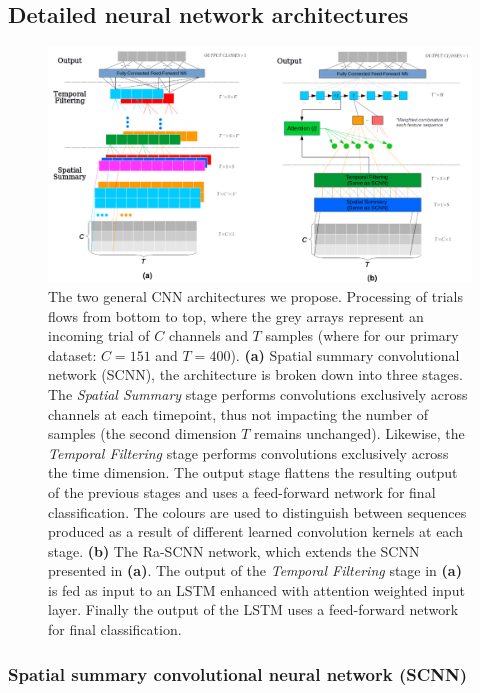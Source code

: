 \documentclass[fleqn,10pt]{wlscirep}
\begin{document}
\subsection*{Detailed neural network architectures}

\begin{figure}[t]
  \centering\includegraphics[width=\linewidth]{architectures.png}
  \caption{The two general CNN architectures we propose. Processing of trials flows from bottom to top, where the grey arrays represent an incoming trial of $C$ channels and $T$ samples (where for our primary dataset: $C=151$ and $T=400$). \textbf{(a)} Spatial summary convolutional network (SCNN), the architecture is broken down into three stages. The {\em Spatial Summary} stage performs convolutions exclusively across channels at each timepoint, thus not impacting the number of samples (the second dimension $T$ remains unchanged). Likewise, the {\em Temporal Filtering} stage performs convolutions exclusively across the time dimension. The output stage flattens the resulting output of the previous stages and uses a feed-forward network for final classification. The colours are used to distinguish between sequences produced as a result of different learned convolution kernels at each stage. \textbf{(b)} The Ra-SCNN network, which extends the SCNN presented in \textbf{(a)}. The output of the {\em Temporal Filtering} stage in \textbf{(a)} is fed as input to an LSTM enhanced with attention weighted input layer. Finally the output of the LSTM uses a feed-forward network for final classification.}
  \label{fig:archs}
\end{figure}

\subsubsection*{Spatial summary convolutional neural network (SCNN)} \label{sec:scnn}
\end{document}
